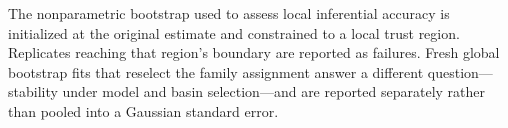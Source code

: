 The nonparametric bootstrap used to assess local inferential accuracy is
initialized at the original estimate and constrained to a local trust region.
Replicates reaching that region's boundary are reported as failures.  Fresh
global bootstrap fits that reselect the family assignment answer a different
question---stability under model and basin selection---and are reported
separately rather than pooled into a Gaussian standard error.
